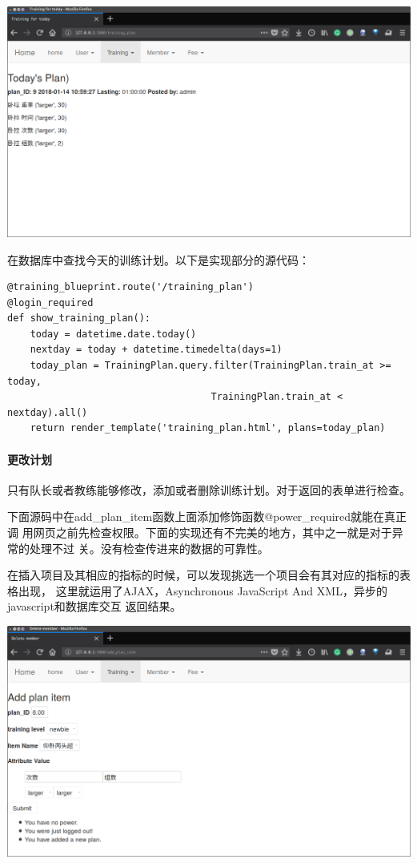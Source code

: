   \includegraphics[width=\textwidth]{figure/plan-added}

\newpage

在数据库中查找今天的训练计划。以下是实现部分的源代码：
\begin{Verbatim}[]
@training_blueprint.route('/training_plan')
@login_required
def show_training_plan():
    today = datetime.date.today()
    nextday = today + datetime.timedelta(days=1)
    today_plan = TrainingPlan.query.filter(TrainingPlan.train_at >= today,
    　　　　　　　　　　　　　　　　　　　TrainingPlan.train_at < nextday).all()
    return render_template('training_plan.html', plans=today_plan)

\end{Verbatim}

\paragraph{更改计划}
只有队长或者教练能够修改，添加或者删除训练计划。对于返回的表单进行检查。

下面源码中在add\_plan\_item函数上面添加修饰函数@power\_required就能在真正调
用网页之前先检查权限。下面的实现还有不完美的地方，其中之一就是对于异常的处理不过
关。没有检查传进来的数据的可靠性。

在插入项目及其相应的指标的时候，可以发现挑选一个项目会有其对应的指标的表格出现，
这里就运用了AJAX，Asynchronous JavaScript And XML，异步的javascript和数据库交互
返回结果。
\vspace{2em}

\includegraphics[width=\textwidth]{figure/add-item-ajax}

